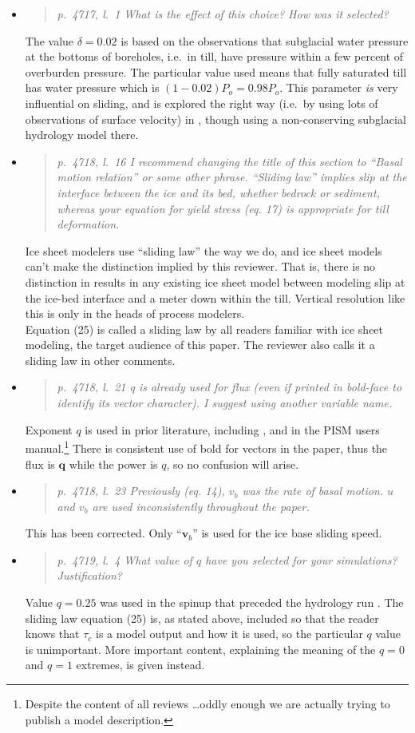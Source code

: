 \documentclass[11pt,reqno]{amsart}
\newcommand{\reply}[2]{
\medskip\medskip
\item  \begin{quote}
\emph{#1}
\end{quote}

\medskip
\noindent #2}
\begin{document}
\begin{itemize}
\reply{p.~4717, l.~1 What is the effect of this choice? How was it selected?}
{The value $\delta=0.02$ is based on the observations that subglacial water pressure at the bottoms of boreholes, i.e.~in till, have pressure within a few percent of overburden pressure.  The particular value used means that fully saturated till has water pressure which is $(1-0.02)P_o=0.98 P_o$.  This parameter \emph{is} very influential on sliding, and is explored the right way (i.e.~by using lots of observations of surface velocity) in \cite{AschwandenAdalgeirsdottirKhroulev}, though using a non-conserving subglacial hydrology model there.}

\reply{p.~4718, l.~16 I recommend changing the title of this section to ``Basal motion relation'' or some other phrase. ``Sliding law'' implies slip at the interface between the ice and its bed, whether bedrock or sediment, whereas your equation for yield stress (eq. 17) is appropriate for till deformation.}
{Ice sheet modelers use ``sliding law'' the way we do, and ice sheet models can't make the distinction implied by this reviewer.  That is, there is no distinction in results in any existing ice sheet model between modeling slip at the ice-bed interface and a meter down within the till.  Vertical resolution like this is only in the heads of process modelers. \\
\indent Equation (25) is called a sliding law by all readers familiar with ice sheet modeling, the target audience of this paper.  The reviewer also calls it a sliding law in other comments.}

\reply{p.~4718, l.~21 q is already used for flux (even if printed in bold-face to identify its vector character).  I suggest using another variable name.}
{Exponent $q$ is used in prior literature, including \cite{AschwandenAdalgeirsdottirKhroulev}, and in the PISM users manual.\footnote{Despite the content of all reviews \dots oddly enough we are actually trying to publish a model description.}  There is consistent use of bold for vectors in the paper, thus the flux is $\mathbf{q}$ while the power is $q$, so no confusion will arise.}

\reply{p.~4718, l.~23 Previously (eq. 14), $v_b$ was the rate of basal motion. $u$ and $v_b$ are used inconsistently throughout the paper.}
{This has been corrected.  Only ``$\mathbf{v}_b$'' is used for the ice base sliding speed.}

\reply{p.~4719, l.~4 What value of $q$ have you selected for your simulations? Justification?}
{Value $q=0.25$ was used in the spinup that preceded the hydrology run \cite{AschwandenAdalgeirsdottirKhroulev}.  The sliding law equation (25) is, as stated above, included so that the reader knows that $\tau_c$ is a model output and how it is used, so the particular $q$ value is unimportant.  More important content, explaining the meaning of the $q=0$ and $q=1$ extremes, is given instead.}


\end{itemize}
\end{document}
